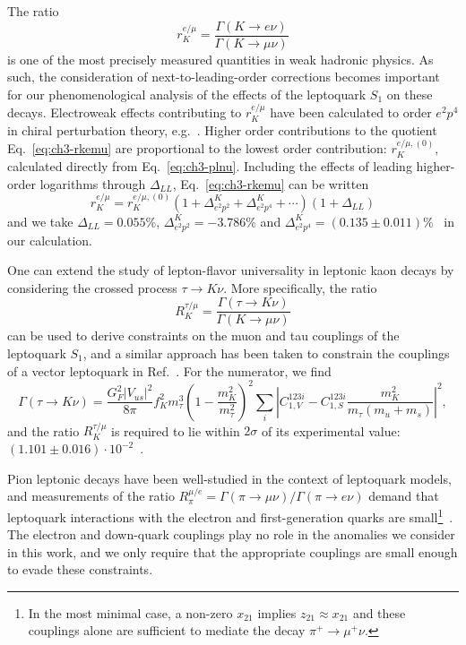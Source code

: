 The ratio
\begin{equation} \label{eq:ch3-rkemu}
  r_K^{e/\mu} = \frac{\Gamma(K \to e \nu)}{\Gamma(K \to \mu \nu)}
\end{equation}
is one of the most precisely measured quantities in weak hadronic physics. As
such, the consideration of next-to-leading-order corrections becomes important
for our phenomenological analysis of the effects of the leptoquark $S_{1}$ on
these decays. Electroweak effects contributing to $r_K^{e/\mu}$ have been
calculated to order $e^2p^4$ in chiral perturbation theory,
e.g.~\cite{Cirigliano:2007ga, Finkemeier:1994ev}. Higher order contributions to
the quotient Eq.~\eqref{eq:ch3-rkemu} are proportional to the lowest order
contribution: $r_K^{e/\mu, (0)}$, calculated directly from Eq.~\eqref{eq:ch3-plnu}.
Including the effects of leading higher-order logarithms through $\Delta_{LL}$,
Eq.~\eqref{eq:ch3-rkemu} can be written
\begin{equation}
  r_K^{e/\mu} = r_K^{e/\mu, (0)} \left( 1 + \Delta^K_{e^2 p^2} + \Delta^K_{e^2 p^4} + \cdots \right) \left( 1 + \Delta_{LL} \right)
\end{equation}
and we take $\Delta_{LL} = 0.055 \%$, $\Delta_{e^2 p^2}^K = -3.786 \%$ and
$\Delta_{e^2 p^4}^K = (0.135 \pm 0.011) \%$~\cite{Cirigliano:2007ga} in our
calculation.

One can extend the study of lepton-flavor universality in leptonic kaon decays
by considering the crossed process $\tau \to K \nu$. More specifically, the
ratio
\begin{equation}
  R_K^{\tau/\mu} = \frac{\Gamma(\tau \to K\nu)}{\Gamma(K \to \mu \nu)}
\end{equation}
can be used to derive constraints on the muon and tau couplings of the
leptoquark $S_{1}$, and a similar approach has been taken to constrain the
couplings of a vector leptoquark in Ref.~\cite{Fajfer:2015ycq}. For the
numerator, we find
\begin{equation}
  \Gamma(\tau \to K \nu) = \frac{G_F^2 |V_{us}|^2}{8 \pi} f_K^2 m_\tau^3 \left( 1 - \frac{m_K^2}{m_\tau^2} \right)^2 \sum_{i} \left| C_{1,V}^{123i}  - C_{1,S}^{123i} \frac{m_K^2}{m_\tau(m_u + m_s)} \right|^2,
\end{equation}
and the ratio $R_K^{\tau/\mu}$ is required to lie within $2\sigma$ of its
experimental value: $(1.101 \pm 0.016) \cdot 10^{-2}$~\cite{Olive:2016xmw}.

Pion leptonic decays have been well-studied in the context of leptoquark models,
and measurements of the ratio $R_\pi^{\mu/e} = \Gamma(\pi \to \mu
\nu)/\Gamma(\pi \to e \nu)$ demand that leptoquark interactions with the
electron and first-generation quarks are small\footnote{In the most minimal
  case, a non-zero $x_{2 1}$ implies $z_{2 1} \approx x_{2 1}$ and these
  couplings alone are sufficient to mediate the decay $\pi^+ \rightarrow \mu^+
  \nu$.}~\cite{Buchmuller:1986iq, Davidson:1993qk}. The electron and down-quark
couplings play no role in the anomalies we consider in this work, and we only
require that the appropriate couplings are small enough to evade these
constraints.

